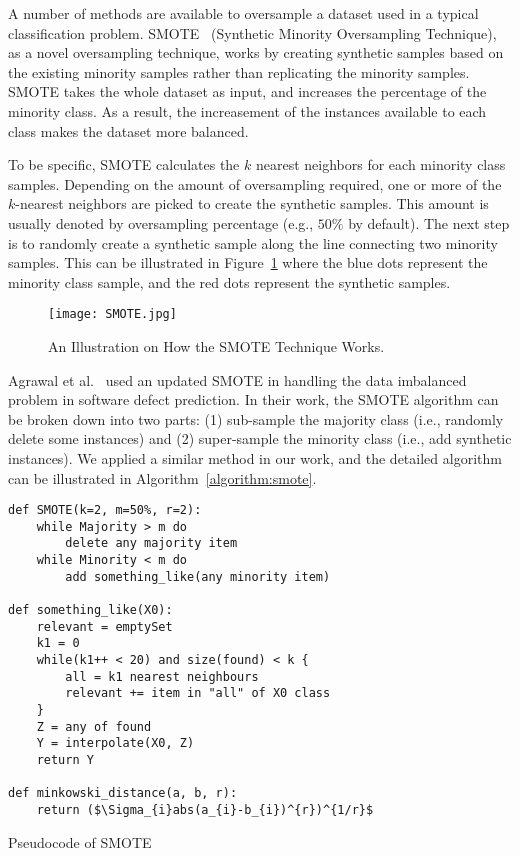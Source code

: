 A number of methods are available to oversample a dataset used in a typical classification problem.
SMOTE~\cite{chawla2002smote} (Synthetic Minority Oversampling Technique), as a novel oversampling technique, works by creating synthetic samples based on the existing minority samples rather than replicating the minority samples. SMOTE takes the whole dataset as input, and increases the percentage of the minority class. As a result, the increasement of the instances available to each class makes the dataset more balanced. 

To be specific, SMOTE calculates the $k$ nearest neighbors for each minority class samples. Depending on the amount of oversampling required, one or more of the $k$-nearest neighbors are picked to create the synthetic samples. This amount is usually denoted by oversampling percentage (e.g., $50\%$ by default). The next step is to randomly create a synthetic sample along the line connecting two minority samples. This can be illustrated in Figure~\ref{figure:SMOTE} where the blue dots represent the minority class sample, and the red dots represent the synthetic samples.  

\begin{figure}[t]
\centerline{\texttt{[image: SMOTE.jpg]}}
\caption{An Illustration on How the SMOTE Technique Works.}    
\label{figure:SMOTE}
\end{figure}

Agrawal et al.~\cite{agrawal2018better} used an updated SMOTE in handling the data imbalanced problem in software defect prediction. In their work, the SMOTE algorithm can be broken down into two parts: (1) sub-sample the majority class (i.e., randomly delete some instances) and (2) super-sample the minority class (i.e., add synthetic instances). We applied a similar method in our work, and the detailed algorithm can be illustrated in Algorithm~\ref{algorithm:smote}.

\begin{algorithm}[t]
\small
\hspace{0.2cm}\begin{lstlisting}[xrightmargin=5.0ex,mathescape,frame=none,numbers=right]
def SMOTE(k=2, m=50%, r=2):
    while Majority > m do
        delete any majority item
    while Minority < m do
        add something_like(any minority item)
        
def something_like(X0):
    relevant = emptySet
    k1 = 0
    while(k1++ < 20) and size(found) < k {
        all = k1 nearest neighbours
        relevant += item in "all" of X0 class
    }
    Z = any of found
    Y = interpolate(X0, Z)
    return Y
    
def minkowski_distance(a, b, r):
    return ($\Sigma_{i}abs(a_{i}-b_{i})^{r})^{1/r}$

\end{lstlisting}
\caption{Pseudocode of SMOTE}
\label{algorithm:smote}  
\end{algorithm}

